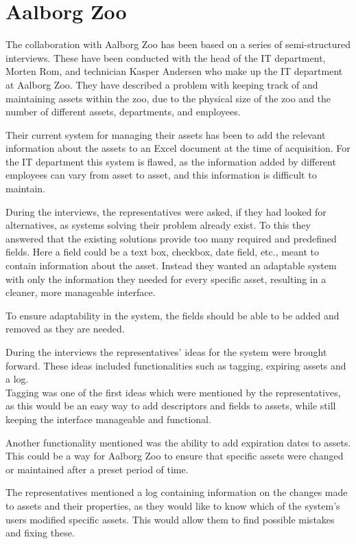 \section{Aalborg Zoo}\label{sc:aalborgZoo}
The collaboration with Aalborg Zoo has been based on a series of semi-structured interviews. These have been conducted with the head of the IT department, Morten Rom, and technician Kasper Andersen who make up the IT department at Aalborg Zoo. They have described a problem with keeping track of and maintaining assets within the zoo, due to the physical size of the zoo and the number of different assets, departments, and employees.
\par
Their current system for managing their assets has been to add the relevant information about the assets to an Excel document at the time of acquisition. For the IT department this system is flawed, as the information added by different employees can vary from asset to asset, and this information is difficult to maintain.
\par
During the interviews, the representatives were asked, if they had looked for alternatives, as systems solving their problem already exist. To this they answered that the existing solutions provide too many required and predefined fields. Here a field could be a text box, checkbox, date field, etc., meant to contain information about the asset. Instead they wanted an adaptable system with only the information they needed for every specific asset, resulting in a cleaner, more manageable interface. 
\par
To ensure adaptability in the system, the fields should be able to be added and removed as they are needed.
\par
During the interviews the representatives' ideas for the system were brought forward. These ideas included functionalities such as tagging, expiring assets and a log. \\
Tagging was one of the first ideas which were mentioned by the representatives, as this would be an easy way to add descriptors and fields to assets, while still keeping the interface manageable and functional.
\par
Another functionality mentioned was the ability to add expiration dates to assets. This could be a way for Aalborg Zoo to ensure that specific assets were changed or maintained after a preset period of time.
\par
The representatives mentioned a log containing information on the changes made to assets and their properties, as they would like to know which of the system's users modified specific assets. This would allow them to find possible mistakes and fixing these. 
